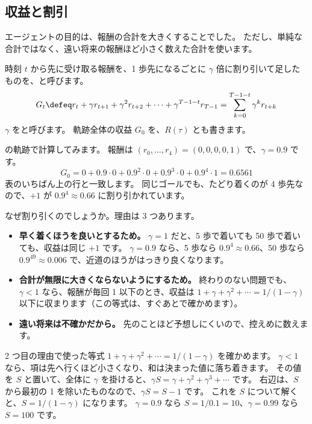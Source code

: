 \subsection*{収益と割引}

エージェントの目的は、報酬の合計を大きくすることでした。
ただし、単純な合計ではなく、遠い将来の報酬ほど小さく数えた合計を使います。

\begin{definition}[収益]\label{def:rlb-return}
時刻 $t$ から先に受け取る報酬を、1 歩先になるごとに $\gamma$ 倍に割り引いて足したものを、と呼びます。
\begin{equation}
G_t\defeq r_t+\gamma r_{t+1}+\gamma^2 r_{t+2}+\cdots+\gamma^{T-1-t}r_{T-1}
=\sum_{k=0}^{T-1-t}\gamma^k r_{t+k}
\label{eq:rlb-return}
\end{equation}
$\gamma$ をと呼びます。
軌跡全体の収益 $G_0$ を、$R(\tau)$ とも書きます。
\end{definition}

の軌跡で計算してみます。
報酬は $(r_0,\dots,r_4)=(0,0,0,0,1)$ で、$\gamma=0.9$ です。
\[
G_0=0+0.9\cdot0+0.9^2\cdot0+0.9^3\cdot0+0.9^4\cdot1=0.6561
\]
表のいちばん上の行と一致します。
同じゴールでも、たどり着くのが 4 歩先なので、$+1$ が $0.9^4\approx0.66$ に割り引かれています。

なぜ割り引くのでしょうか。理由は 3 つあります。
\begin{itemize}
\item \textbf{早く着くほうを良いとするため。}
$\gamma=1$ だと、5 歩で着いても 50 歩で着いても、収益は同じ $+1$ です。
$\gamma=0.9$ なら、5 歩なら $0.9^4\approx0.66$、50 歩なら $0.9^{49}\approx0.006$ で、近道のほうがはっきり良くなります。
\item \textbf{合計が無限に大きくならないようにするため。}
終わりのない問題でも、$\gamma<1$ なら、報酬が毎回 1 以下のとき、収益は $1+\gamma+\gamma^2+\cdots=1/(1-\gamma)$ 以下に収まります（この等式は、すぐあとで確かめます）。
\item \textbf{遠い将来は不確かだから。}
先のことほど予想しにくいので、控えめに数えます。
\end{itemize}

2 つ目の理由で使った等式 $1+\gamma+\gamma^2+\cdots=1/(1-\gamma)$ を確かめます。
$\gamma<1$ なら、項は先へ行くほど小さくなり、和は決まった値に落ち着きます。
その値を $S$ と置いて、全体に $\gamma$ を掛けると、$\gamma S=\gamma+\gamma^2+\gamma^3+\cdots$ です。
右辺は、$S$ から最初の 1 を除いたものなので、$\gamma S=S-1$ です。
これを $S$ について解くと、$S=1/(1-\gamma)$ になります。
$\gamma=0.9$ なら $S=1/0.1=10$、$\gamma=0.99$ なら $S=100$ です。


